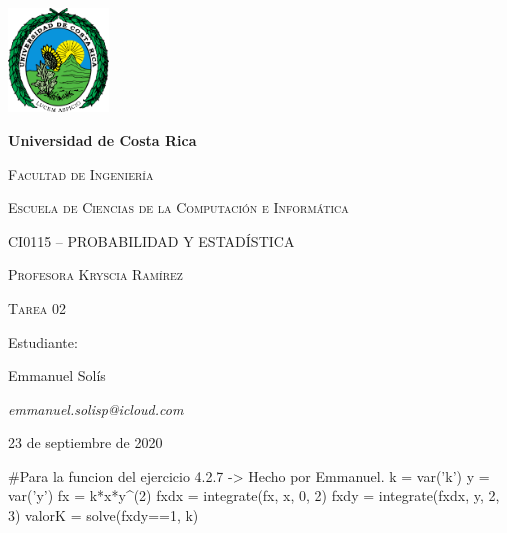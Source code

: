 \documentclass{article}\usepackage[]{graphicx}\usepackage[]{color}
\begin{document}
\begin{titlepage}
\centering
{\includegraphics[width=0.2\textwidth]{logoUCR}\par}
\vspace{1cm}
{\bfseries\LARGE Universidad de Costa Rica \par}
\vspace{1cm}
{\scshape\Large Facultad de Ingenier\'ia \par}
{\scshape\Large Escuela de Ciencias de la Computaci\'on e Inform\'atica \par}
\vspace{1cm}
{\scshape\Large CI0115 – PROBABILIDAD Y ESTADÍSTICA \par}
{\scshape\Large Profesora Kryscia Ram\'irez \par}
\vspace{1cm}
{\scshape\Huge Tarea 02 \par}
\vspace{1cm}
{\Large Estudiante: \par}
{\Large Emmanuel Sol\'is \par}
{\Large \textit{\color{blue}emmanuel.solisp@icloud.com} \par}
\vspace{2cm}
{\Large 23 de septiembre de 2020 \par}
\end{titlepage}

\newpage
\tableofcontents

\newpage


\begin{sagesilent}
#Para la funcion del ejercicio 4.2.7 -> Hecho por Emmanuel.
k = var('k')
y = var('y')
fx = k*x*y^(2)
fxdx = integrate(fx, x, 0, 2)
fxdy = integrate(fxdx, y, 2, 3)
valorK = solve(fxdy==1, k)
\end{sagesilent}
\end{document}
